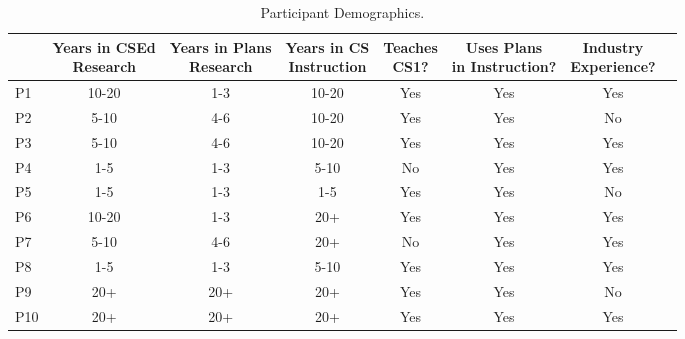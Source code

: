 \begin{table*}
\caption{Participant Demographics.}
    \centering
    \footnotesize
    \label{tab:participants}
    \begin{tabular}{l|ccccccc}
    \toprule
            & \thead{Years in CSEd \\ Research} & \thead{Years in Plans \\ Research} & \thead{Years in CS \\ Instruction} & \thead{Teaches \\ CS1?} & \thead{Uses Plans \\ in Instruction?} & \thead{Industry \\ Experience?}
    \\\midrule
        P1 & 10-20 & 1-3 & 10-20 & Yes  & Yes & Yes \\
        P2 & 5-10 & 4-6 & 10-20 & Yes  & Yes & No \\ 
        P3 & 5-10 & 4-6 & 10-20 & Yes  & Yes & Yes \\ 
        P4 & 1-5 & 1-3 & 5-10 & No  & Yes & Yes \\ 
        P5 & 1-5 & 1-3 & 1-5 & Yes  & Yes & No \\ 
        P6 & 10-20 & 1-3 & 20+ & Yes  & Yes & Yes \\ 
        P7 & 5-10 & 4-6 & 20+ & No  & Yes & Yes \\ 
        P8 & 1-5 & 1-3 & 5-10 & Yes  & Yes & Yes \\ 
        P9 & 20+ & 20+ & 20+ & Yes  & Yes & No \\ 
        P10 & 20+ & 20+ & 20+ & Yes  & Yes & Yes \\ 
    \end{tabular}%
\end{table*}



